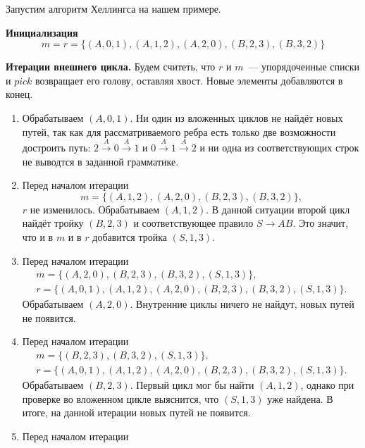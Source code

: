 \begin{example}
    Запустим алгоритм Хеллингса на нашем примере.

    \textbf{Инициализация}
    \[ m = r = \{(A,0,1),(A,1,2),(A,2,0),(B,2,3),(B,3,2)\} \]

    \textbf{Итерации внешнего цикла.}
    Будем считеть, что $r$ и $m$~--- упорядоченные списки и $pick$ возвращает его голову, оставляя хвост.
    Новые элементы добавляются в конец.
    \begin{enumerate}
        \item Обрабатываем $(A, 0, 1)$.
              Ни один из вложенных циклов не найдёт новых путей, так как для рассматриваемого ребра есть только две возможности достроить путь: $2 \xrightarrow{A} 0 \xrightarrow{A} 1$ и $0 \xrightarrow{A} 1 \xrightarrow{A} 2$
              и ни одна из соответствующих строк не выводтся в заданной грамматике.
        \item Перед началом итерации
              \[
                  m = \{(A, 1, 2), (A, 2, 0), (B, 2, 3), (B, 3, 2)\},
              \]
              $r$ не изменилось.
              Обрабатываем $(A, 1, 2)$.
              В данной ситуации второй цикл найдёт тройку $(B, 2, 3)$ и соответствующее правило $S \to A B$.
              Это значит, что и в $m$ и в $r$ добавится тройка $(S, 1, 3)$.
        \item Перед началом итерации
              \begin{gather*}
                  m = \{(A, 2, 0), (B, 2, 3), (B, 3, 2), (S, 1, 3)\},                        \\
                  r = \{(A, 0, 1), (A, 1, 2), (A, 2, 0), (B, 2, 3), (B, 3, 2), (S, 1, 3)\}.
              \end{gather*}
              Обрабатываем $(A, 2, 0)$.
              Внутренние циклы ничего не найдут, новых путей не появится.
        \item Перед началом итерации
              \begin{gather*}
                  m = \{(B, 2, 3), (B, 3, 2), (S, 1, 3)\},\\
                  r = \{(A, 0, 1), (A, 1, 2), (A, 2, 0), (B, 2, 3), (B, 3, 2), (S, 1, 3)\}.
              \end{gather*}
              Обрабатываем $(B, 2, 3)$.
              Первый цикл мог бы найти $(A, 1, 2)$, однако при проверке во вложенном цикле выяснится, что $(S, 1, 3)$ уже найдена.
              В итоге, на данной итерации новых путей не появится.
        \item Перед началом итерации

\end{enumerate}
\end{example}
